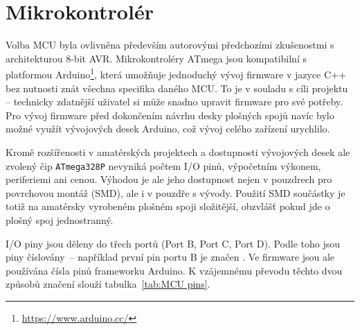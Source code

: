 \section{Mikrokontrolér}
Volba \acs{MCU} byla ovlivněna především autorovými předchozími zkušenostmi
s architekturou 8-bit AVR. Mikrokontroléry ATmega jsou kompatibilní
s platformou Arduino\footnote{\url{https://www.arduino.cc/}}, která umožňuje
jednoduchý vývoj firmware v jazyce C++ bez nutnosti znát všechna specifika
daného MCU. To je v souladu s cíli projektu -- technicky zdatnější uživatel si
může snadno upravit firmware pro své potřeby. Pro vývoj firmware před
dokončením návrhu desky plošných spojů navíc bylo možné využít vývojových desek
Arduino, což vývoj celého zařízení urychlilo.

Kromě rozšířenosti v amatérských projektech a dostupnosti vývojových desek ale
zvolený čip \texttt{ATmega328P} nevyniká počtem I/O pinů, výpočetním
výkonem, periferiemi ani cenou. Výhodou je ale jeho dostupnost nejen
v pouzdrech pro povrchovou montáž (\acs{SMD}), ale i v pouzdře s vývody.
Použití SMD součástky je totiž na amatérsky vyrobeném plošném spoji složitější,
obzvlášť pokud jde o plošný spoj jednostranný.

\nocite{dshATmega328} %

I/O piny jsou děleny do třech portů (Port B, Port C, Port D). Podle toho jsou
piny číslovány~-- například první pin portu B je značen . Ve
firmware jsou ale používána čísla pinů frameworku Arduino. K vzájemnému převodu
těchto dvou způsobů značení slouží tabulka~\vref{tab:MCU pins}.


